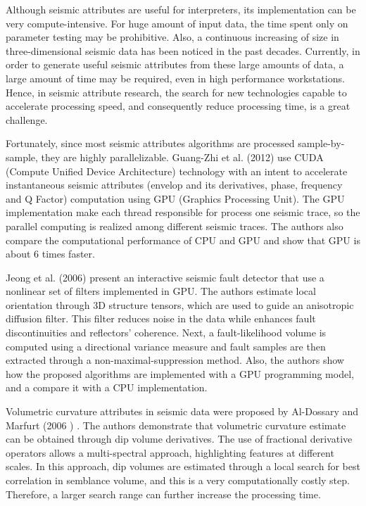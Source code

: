 \documentclass[conference]{IEEEtran}
\begin{document}
Although seismic attributes are useful for interpreters, its implementation can be very compute-intensive. For huge amount of input data, the time spent only on parameter testing may be prohibitive. Also, a continuous increasing of size in three-dimensional seismic data has been noticed in the past decades. Currently, in order to generate useful seismic attributes from these large amounts of data, a large amount of time may be required, even in high performance workstations. Hence, in seismic attribute research, the search for new technologies capable to accelerate processing speed, and consequently reduce processing time, is a great challenge.

Fortunately, since most seismic attributes algorithms are processed sample-by-sample, they are highly parallelizable. Guang-Zhi et al. (2012) use CUDA (Compute Unified Device Architecture) technology with an intent to accelerate instantaneous seismic attributes (envelop and its derivatives, phase, frequency and Q Factor) computation using GPU (Graphics Processing Unit). The GPU implementation make each thread responsible for process one seismic trace, so the parallel computing is realized among different seismic traces. The authors also compare the computational performance of CPU and GPU and show that GPU is about 6 times faster.

Jeong et al. (2006) present an interactive seismic fault detector that use a nonlinear set of filters implemented in GPU. The authors estimate local orientation through 3D structure tensors, which are used to guide an anisotropic diffusion filter. This filter reduces noise in the data while enhances fault discontinuities and reflectors' coherence. Next, a fault-likelihood volume is computed using a directional variance measure and fault samples are then extracted through a non-maximal-suppression method. Also, the authors show how the proposed algorithms are implemented with a GPU programming model, and a compare it with a CPU implementation.

Volumetric curvature attributes in seismic data were proposed by Al-Dossary and Marfurt (2006 ) . The authors demonstrate that volumetric curvature estimate can be obtained through dip volume derivatives. The use of fractional derivative operators allows a multi-spectral approach, highlighting features at different scales. In this approach, dip volumes are estimated through a local search for best correlation in semblance volume, and this is a very computationally costly step. Therefore, a larger search range can further increase the processing time.
\end{document}
